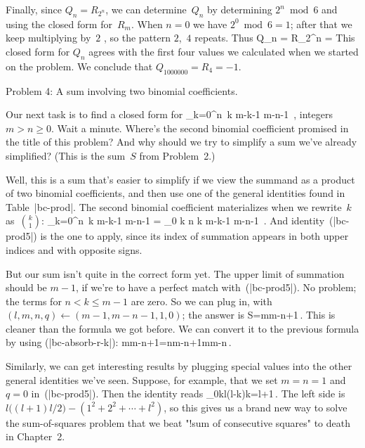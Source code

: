 {Finally, since $Q_n = R_{2^n}$,
we can determine~$Q_n$ by determining $2^n \bmod 6$
and using the closed form for~$R_m$.
When $n=0$ we have $2^0 \bmod 6 = 1$;
after that we keep multiplying by~$2$ ,
so the pattern $2$,~$4$ repeats.
Thus
\begindisplay
 Q_n
	= R_{2^n}
	= 
\enddisplay
This closed form for $Q_n$ agrees with the first four values we calculated
when we started on the problem.
We conclude that $Q_{1000000} = R_4 = -1$.

\subhead Problem 4: A sum involving two binomial coefficients.

Our next task is to find a closed form for
\begindisplay
 \sum_{k=0}^n \,k {m-k-1 \choose m-n-1} \,,
					\qquad\hbox{integers $m > n \geq 0$.}
\enddisplay
Wait a minute.
Where's the second binomial coefficient promised in the title of this problem?
And why should we try to simplify a sum we've already simplified?
(This is the sum~$S$ from Problem~2.)

Well, this is a sum that's easier to simplify
if we view the summand as a product of two binomial coefficients,
and then use one of the general identities found in Table~|bc-prod|.
The second binomial coefficient materializes
when we rewrite~$k$ as~$k \choose 1$:
\begindisplay
 \sum_{k=0}^n \,k {m-k-1 \choose m-n-1}
	= \sum_{0 \leq k \leq n} {k } {m-k-1 \choose m-n-1} \,.
\enddisplay
And identity~\eq(|bc-prod5|) is the one to apply,
since its index of summation appears
in both upper indices and with opposite signs.

But our sum isn't quite in the correct form yet.
The upper limit of summation should be $m-1$, if we're to have
a perfect match with~\eq(|bc-prod5|). No problem; the
terms for $n<k\le m-1$ are zero. So we can plug in,
with $(l,m,n,q)\gets(m-1,m-n-1,1,0)$; the answer is
\begindisplay
S={m\choose m-n+1}\,.
\enddisplay
This is cleaner than the formula we got before. We can convert
it to the previous formula by using \eq(|bc-absorb-r-k|):
\begindisplay
{m\choose m-n+1}={n\over m-n+1}{m\choose m-n}\,.
\enddisplay

Similarly, we can get interesting results by plugging special values
into the other general identities we've seen. Suppose, for example, that we
set $m=n=1$ and $q=0$ in~\eq(|bc-prod5|). Then the identity reads
\begindisplay
\sum_{0\le k\le l}(l-k)k={l+1}\,.
\enddisplay
The left side is $l\bigl((l+1)l/2\bigr)-(1^2+2^2+\cdots+l^2)$, so this gives us
a brand new way to solve the sum-of-squares problem that we beat
"!sum of consecutive squares"
to death in Chapter~2.

}
